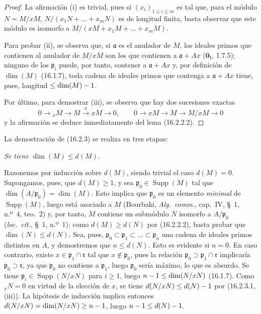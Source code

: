 \begin{proof}
La afirmación (i) es trivial, pues si $(x_i)_{1\leq i\leq m}$ es tal que, para
el módulo $N=M/xM$, $N/(x_1N+\ldots+x_mN)$ es de longitud finita, basta
observar que este módulo es isomorfo a
$M/(xM+x_1M+\ldots+x_mM)$.

Para probar (ii), se observa que, si $\mathfrak{a}$ es el anulador de $M$, los
ideales primos que contienen al anulador de $M/xM$ son los que contienen a
$\mathfrak{a}+Ax$ ($\mathbf{0}_{\mathrm I}$, 1.7.5); ninguno de los
$\mathfrak{p}_i$ puede, por tanto, contener a $\mathfrak{a}+Ax$ y, por
definición de $\dim(M)$ (16.1.7), toda cadena de ideales primos que contenga a
$\mathfrak{a}+Ax$ tiene, pues, longitud $\leq\dim(M)- 1$.


Por último, para demostrar (iii), se observa que hay dos sucesiones exactas
\[
  0\to{}_xM\to M\xrightarrow{x}xM\to0,\qquad
  0\to xM\to M\to M/xM\to0
\]
y la afirmación se deduce inmediatamente del lema (16.2.2.2).
\end{proof}

La demostración de (16.2.3) se realiza en tres etapas:

\begin{env}[16.2.3.2]
\label{0.16.2.3.2-fr}
\emph{Se tiene} $\dim(M)\leq d(M)$.
\end{env}

Razonemos por inducción sobre $d(M)$, siendo trivial el caso $d(M)=0$.
Supongamos, pues, que $d(M)\geq1$, y sea
$\mathfrak{p}_0\in\operatorname{Supp}(M)$ tal que
$\dim(A/\mathfrak{p}_0)=\dim(M)$. Esto implica que $\mathfrak{p}_0$ es un
elemento \emph{minimal} de $\operatorname{Supp}(M)$, luego está asociado a $M$
(Bourbaki, \emph{Alg.~comm.}, cap.~IV, \S~1, n.º~4, teo.~2) y, por tanto, $M$
contiene un submódulo $N$ isomorfo a $A/\mathfrak{p}_0$ (\emph{loc.~cit.},
\S~1, n.º~1); como $d(M)\geq d(N)$ por (16.2.2.2), basta probar que
$\dim(N)\leq d(N)$. Sea, pues,
$\mathfrak{p}_0\subset\mathfrak{p}_1\subset\ldots\subset\mathfrak{p}_n$ una
cadena de ideales primos distintos en $A$, y demostremos que $n\leq d(N)$.
Esto es evidente si $n=0$. En caso contrario, existe
$x\in\mathfrak{p}_1\cap\mathfrak{r}$ tal que $x\notin\mathfrak{p}_0$, pues la
relación $\mathfrak{p}_0\supset\mathfrak{p}_1\cap\mathfrak{r}$ implicaría
$\mathfrak{p}_0\supset\mathfrak{r}$, ya que $\mathfrak{p}_0$ no contiene a
$\mathfrak{p}_1$, luego $\mathfrak{p}_0$ sería máximo, lo que es absurdo.
Se tiene $\mathfrak{p}_i\in\operatorname{Supp}(N/xN)$ para $i\geq1$, luego
$n- 1\leq\dim(N/xN)$ (16.1.7). Como ${}_xN=0$ en virtud de la elección de $x$,
se tiene $d(N/xN)\leq d(N)- 1$ por (16.2.3.1, (iii)). La hipótesis de inducción
implica entonces $d(N/xN)=\dim(N/xN)\geq n- 1$, luego
$n- 1\leq d(N)- 1$.

